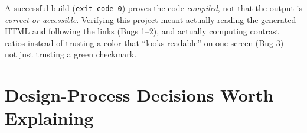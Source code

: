 \documentclass[11pt]{article}
\begin{document}
\begin{whybox}[title={\textbf{The general lesson from all three bugs}}]
A successful build (\texttt{exit code 0}) proves the code
\emph{compiled}, not that the output is \emph{correct or accessible}.
Verifying this project meant actually reading the generated HTML and
following the links (Bugs 1--2), and actually computing contrast ratios
instead of trusting a color that ``looks readable'' on one screen
(Bug 3) --- not just trusting a green checkmark.
\end{whybox}

\section{Design-Process Decisions Worth Explaining}
\label{sec:designprocess}
\end{document}
